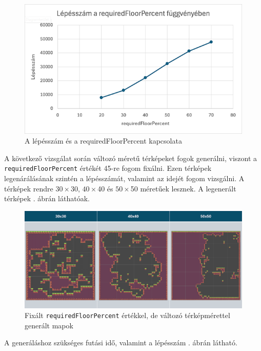 \begin{figure}[ht]
\centering
\includegraphics[width = \textwidth]{images/grafikon.png}
\caption{A lépésszám és a requiredFloorPercent kapcsolata}
\label{fig:randomwalkgrafikon}
\end{figure}

\newpage
A következő vizsgálat során változó méretű térképeket fogok generálni, viszont a \texttt{requiredFloorPercent} értékét 45-re fogom fixálni. Ezen térképek legenárálásának szintén a lépésszámát, valamint az idejét fogom vizsgálni. A térképek rendre $30 \times $30, $40 \times $40 és $50 \times $50 méretűek lesznek. A legenerált térképek . ábrán láthatóak.

\begin{figure}[ht]
\centering
\includegraphics[width = \textwidth]{images/changingmaprandomwalk.png}
\caption{Fixált \texttt{requiredFloorPercent} értékkel, de változó térképmérettel generált mapok}
\label{fig:changingmaprandomwalk}
\end{figure}

A generáláshoz szükséges futási idő, valamint a lépésszám . ábrán látható.

